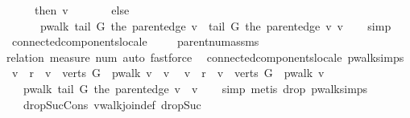 \begin{isabellebody}
\ \ \ \ \ \ then\ {\isacharbrackleft}v{\isacharbrackright}\ \isanewline
\ \ \ \ \ \ else\ \isanewline
\ \ \ \ \ \ \ pwalk\ {\isacharparenleft}tail\ G\ {\isacharparenleft}the\ {\isacharparenleft}parent{\isacharunderscore}edge\ v{\isacharparenright}{\isacharparenright}{\isacharparenright}\ {\isasymoplus}\ {\isacharbrackleft}tail\ G\ {\isacharparenleft}the\ {\isacharparenleft}parent{\isacharunderscore}edge\ v{\isacharparenright}{\isacharparenright}{\isacharcomma}\ v{\isacharbrackright}{\isacharparenright}{\isachardoublequoteclose}\isanewline
%
\isadelimproof
\ \ %
\endisadelimproof
%
\isatagproof
{}\isamarkupfalse%
\ simp{\isacharplus}%
\endisatagproof
{\isafoldproof}%
%
\isadelimproof
\isanewline
%
\endisadelimproof
{}\isamarkupfalse%
\ {\isacharparenleft}\ connected{\isacharunderscore}components{\isacharunderscore}locale{\isacharparenright}\ \isanewline
%
\isadelimproof
\ \ %
\endisadelimproof
%
\isatagproof
{}\isamarkupfalse%
\ parent{\isacharunderscore}num{\isacharunderscore}assms\isanewline
\ \ \isamarkupfalse%
\ {\isacharparenleft}relation\ {\isachardoublequoteopen}measure\ num{\isachardoublequoteclose}{\isacharcomma}\ auto{\isacharcomma}\ fastforce{\isacharparenright}%
\endisatagproof
{\isafoldproof}%
%
\isadelimproof
\isanewline
%
\endisadelimproof
\isanewline
{}\isamarkupfalse%
\ {\isacharparenleft}\ connected{\isacharunderscore}components{\isacharunderscore}locale{\isacharparenright}\ pwalk{\isacharunderscore}simps{\isacharcolon}\isanewline
\ \ {\isachardoublequoteopen}v\ {\isacharequal}\ r\ {\isasymor}\ v\ {\isasymnotin}\ verts\ G\ {\isasymLongrightarrow}\ pwalk\ v\ {\isacharequal}\ {\isacharbrackleft}v{\isacharbrackright}{\isachardoublequoteclose}\isanewline
\ \ {\isachardoublequoteopen}v\ {\isasymnoteq}\ r\ {\isasymLongrightarrow}\ v\ {\isasymin}\ verts\ G\ {\isasymLongrightarrow}\ pwalk\ v\ {\isacharequal}\isanewline
\ \ \ \ pwalk\ {\isacharparenleft}tail\ G\ {\isacharparenleft}the\ {\isacharparenleft}parent{\isacharunderscore}edge\ v{\isacharparenright}{\isacharparenright}{\isacharparenright}\ {\isacharat}\ {\isacharbrackleft}v{\isacharbrackright}{\isachardoublequoteclose}\isanewline
%
\isadelimproof
\ \ %
\endisadelimproof
%
\isatagproof
{}\isamarkupfalse%
\ {\isacharparenleft}simp{\isacharcomma}\ metis\ drop{\isacharunderscore}{}\ pwalk{\isachardot}simps\isanewline
\ \ \ \ drop{\isacharunderscore}Suc{\isacharunderscore}Cons\ vwalk{\isacharunderscore}join{\isacharunderscore}def\ drop{\isacharunderscore}Suc{\isacharparenright}%

\end{isabellebody}
